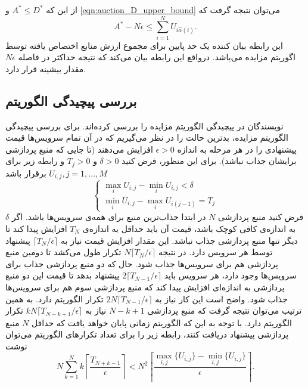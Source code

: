       از این که $A^* \le D^*$ و \cref{eqn:auction_D_upper_bound} می‌توان نتیجه گرفت که
      \begin{equation}
        A^* - N \epsilon \le \sum_{i=1}^N U_{i \hat \alpha (i)}.
      \end{equation}
      این رابطه بیان کننده یک حد پایین برای مجموع ارزش منابع اختصاص یافته توسط اگوریتم مزایده می‌باشد.
      درواقع این رابطه بیان می‌کند که نتیجه حداکثر در فاصله $N \epsilon$ مقدار بیشینه قرار دارد.
    \subsection{بررسی پیچیدگی الگوریتم}
      نویسندگان در \cite{distributed_auction_algorithms_zavlanos} پیچیدگی الگوریتم مزایده را بررسی کرده‌اند.
      برای بررسی پیچیدگی الگوریتم مزایده، بدترین حالت را در نظر می‌گیریم که در آن تمام سرویس‌ها قیمت پیشنهادی را در هر مرحله به اندازه $\epsilon > 0$ افزایش می‌دهند (تا جایی که منبع پردازشی برایشان جذاب نباشد).
      برای این منظور، فرض کنید $\delta > 0$ و $T_j>0$ و رابطه زیر برای $U_{i,j}, j=1,\hdots,M$ برقرار باشد
      \begin{equation*}
        \begin{cases}
          \max_i U_{i,j} - \min_i U_{i,j} < \delta \\
          \min_i U_{i,j} - \max_i U_{i(j-1)} = T_j
        \end{cases}
      \end{equation*}
      فرض کنید منبع پردازشی $N$ در ابتدا جذاب‌ترین منبع برای همه‌ی سرویس‌ها باشد.
      اگر $\delta$ به اندازه‌ی کافی کوچک باشد، قیمت آن باید حداقل به اندازه‌ی $T_N$ افزایش پیدا کند تا دیگر تنها منبع پردازشی جذاب نباشد.
      این مقدار افزایش قیمت نیاز به $\lceil T_N / \epsilon \rceil$ پیشنهاد توسط هر سرویس دارد.
      در نتیجه $N \lceil T_N / \epsilon \rceil$ تکرار طول می‌کشد تا دومین منبع پردازشی هم برای سرویس‌ها جذاب شود.
      حال که دو منبع پردازشی جذاب برای سرویس‌ها وجود دارد، هر سرویس باید $2 \lceil T_{N-1} / \epsilon \rceil$ پیشنهاد بدهد تا قیمت این دو منبع پردازشی به اندازه‌ای افزایش پیدا کند که منبع پردازشی سوم هم برای سرویس‌ها جذاب شود.
      واضح است این کار نیاز به $2N \lceil T_{N-1} / \epsilon \rceil$ تکرار الگوریتم دارد.
      به همین ترتیب می‌توان نتیجه گرفت که منبع پردازشی $N-k+1$ نیاز به $kN \lceil T_{N-k+1} / \epsilon \rceil$ تکرار الگوریتم دارد.
      با توجه به این که الگوریتم زمانی پایان خواهد یافت که حداقل $N$ منبع پردازشی پیشنهاد دریافت کنند، رابطه زیر را برای تعداد تکرار‌های الگوریتم می‌توان نوشت
      \begin{equation}
        N\sum_{k=1}^N k \left \lceil \frac{T_{N+k-1}}{\epsilon} \right\rceil < N ^ 2 \left \lceil \frac{\max_{i,j} \{U_{i,j}\} - \min_{i,j} \{U_{i,j}\}}{\epsilon} \right\rceil.
      \end{equation}
